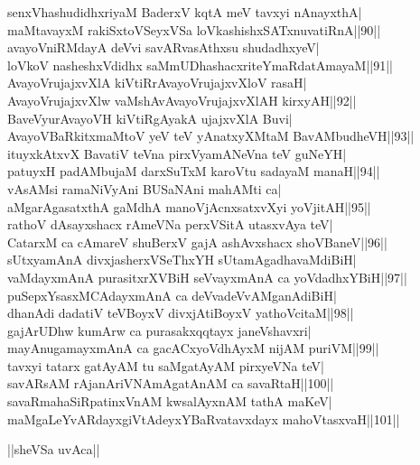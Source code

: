 \documentclass{article}
\begin{document}
senxVhashudidhxriyaM BaderxV kqtA meV tavxyi nAnayxthA|\\
maMtavayxM rakiSxtoVSeyxVSa loVkashishxSATxnuvatiRnA||90||\\
avayoVniRMdayA deVvi savARvasAthxsu shudadhxyeV|\\
loVkoV nasheshxVdidhx saMmUDhashacxriteYmaRdatAmayaM||91||\\
AvayoVrujajxvXlA kiVtiRrAvayoVrujajxvXloV rasaH|\\
AvayoVrujajxvXlw vaMshAvAvayoVrujajxvXlAH kirxyAH||92||\\
BaveVyurAvayoVH kiVtiRgAyakA ujajxvXlA Buvi|\\
AvayoVBaRkitxmaMtoV yeV teV yAnatxyXMtaM BavAMbudheVH||93||\\
ituyxkAtxvX BavatiV teVna pirxVyamANeVna teV guNeYH|\\
patuyxH padAMbujaM darxSuTxM karoVtu sadayaM manaH||94||\\
vAsAMsi ramaNiVyAni BUSaNAni mahAMti ca|\\
aMgarAgasatxthA gaMdhA manoVjAcnxsatxvXyi yoVjitAH||95||\\
rathoV dAsayxshacx rAmeVNa perxVSitA utasxvAya teV|\\
CatarxM ca cAmareV shuBerxV gajA ashAvxshacx shoVBaneV||96||\\
sUtxyamAnA divxjasherxVSeThxYH sUtamAgadhavaMdiBiH|\\
vaMdayxmAnA purasitxrXVBiH seVvayxmAnA ca yoVdadhxYBiH||97||\\
puSepxYsasxMCAdayxmAnA ca deVvadeVvAMganAdiBiH|\\
dhanAdi dadatiV teVBoyxV divxjAtiBoyxV yathoVcitaM||98||\\
gajArUDhw kumArw ca purasakxqqtayx janeVshavxri|\\
mayAnugamayxmAnA ca gacACxyoVdhAyxM nijAM puriVM||99||\\
tavxyi tatarx gatAyAM tu saMgatAyAM pirxyeVNa teV|\\
savARsAM rAjanAriVNAmAgatAnAM ca savaRtaH||100||\\
savaRmahaSiRpatinxVnAM kwsalAyxnAM tathA maKeV|\\
maMgaLeYvARdayxgiVtAdeyxYBaRvatavxdayx mahoVtasxvaH||101||\\

\begin{center}
||sheVSa uvAca||
\end{center}
\end{document}
